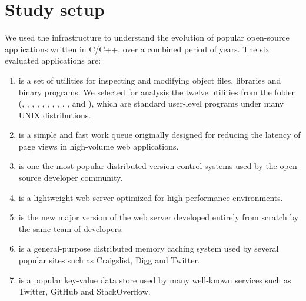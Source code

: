 \section{Study setup}
\label{sec:study-setup}

We used the \covrig infrastructure to understand the evolution of
\numSystems popular open-source applications written in C/C++, over a
combined period of \numYears years. The six evaluated applications are:

\begin{enumerate}

\item[\gnu~\binutils\footnote{\url{http://www.gnu.org/software/binutils/}}]
is a set of utilities for inspecting and modifying object files,
libraries and binary programs.  We selected for analysis the twelve
utilities from the  folder (, ,
, , , , ,
, , ,  and ),
which are standard user-level programs under many UNIX distributions.

\item[\beanstalkd\footnote{\url{http://kr.github.io/beanstalkd/}}]
is a simple and fast work queue originally designed for reducing the latency of
page views in high-volume web applications.

\item[\git\footnote{\url{http://git-scm.com/}}]
is one the most popular distributed version control systems used by the
open-source developer community.

\item[\lighttpd\footnote{\url{http://www.lighttpd.net/}}]
is a lightweight web server optimized for high performance environments.

\item[\lighttpdtwo\footnote{\url{http://redmine.lighttpdtwo.net/projects/lighttpdtwo2/}}]
is the new major version of the \lighttpd web server developed entirely from
scratch by the same team of developers.

\item[\memcached\footnote{\url{http://memcached.org/}}]
is a general-purpose distributed memory caching system used by several popular
sites such as Craigslist, Digg and Twitter.

\item[\redis\footnote{\url{http://redis.io/}}]
is a popular key-value data store used by many well-known services such as
Twitter, GitHub and StackOverflow.


\end{enumerate}
